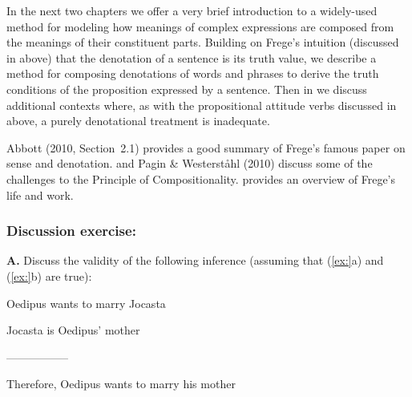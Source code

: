 In the next two chapters we offer a very brief introduction to a widely-used method for modeling how meanings of complex expressions are composed from the meanings of their constituent parts. Building on Frege’s intuition (discussed in  above) that the denotation of a sentence is its truth value, we describe a method for composing denotations of words and phrases to derive the truth conditions of the proposition expressed by a sentence. Then in  we discuss additional contexts where, as with the propositional attitude verbs discussed in  above, a purely denotational treatment is inadequate.



\furtherreading



Abbott (2010, Section~2.1) provides a good summary of Frege’s famous paper on sense and denotation. \citet{Goldberg2015} and Pagin \& Westerståhl (2010) discuss some of the challenges to the Principle of Compositionality. \citet{Zalta2017} provides an overview of Frege’s life and work.


\subsubsection{Discussion exercise:}\label{sec:}

\textbf{A.} Discuss the validity of the following inference (assuming that (\ref{ex:}a) and (\ref{ex:}b) are true):

\ea
\ea
Oedipus wants to marry Jocasta

\ex Jocasta is Oedipus’ mother

-----------------

\ex Therefore, Oedipus wants to marry his mother
\z
\z
